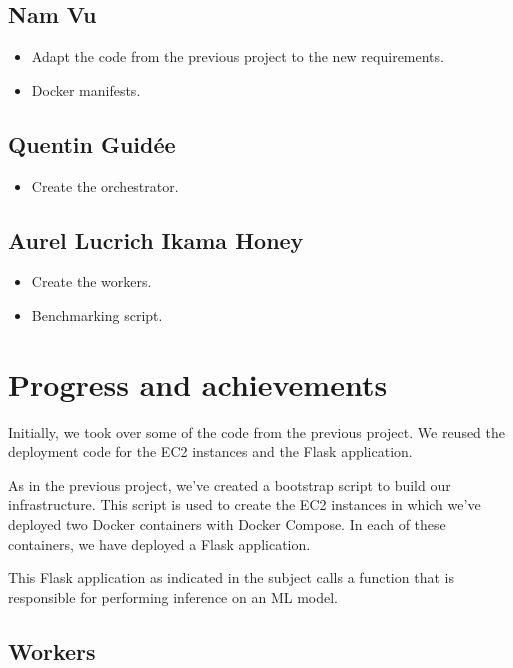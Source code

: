 \documentclass[letterpaper,headings=standardclasses,parskip=half]{scrartcl}
\begin{document}
\subsection*{Nam Vu}

\begin{itemize}
    \item Adapt the code from the previous project to the new requirements.
    \item Docker manifests.
\end{itemize}

\subsection*{Quentin Guidée}

\begin{itemize}
    \item Create the orchestrator.
\end{itemize}

\subsection*{Aurel Lucrich Ikama Honey}

\begin{itemize}
    \item Create the workers.
    \item Benchmarking script.
\end{itemize}

\section{Progress and achievements}

Initially, we took over some of the code from the previous project. We reused the deployment code for the EC2 instances and the Flask application.

As in the previous project, we've created a bootstrap script to build our infrastructure. This script is used to create the EC2 instances in which we've deployed two Docker containers with Docker Compose. In each of these containers, we have deployed a Flask application.

This Flask application as indicated in the subject calls a function that is responsible for performing inference on an ML model.

\subsection{Workers}
\end{document}
